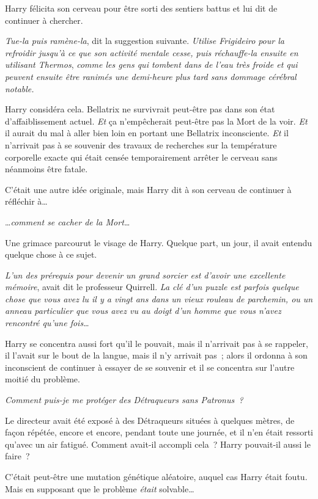 Harry félicita son cerveau pour être sorti des sentiers battus et lui dit de continuer à chercher.

\emph{Tue-la puis ramène-la}, dit la suggestion suivante. \emph{Utilise Frigideiro} \emph{pour la refroidir jusqu'à ce que son activité mentale cesse, puis réchauffe-la ensuite en utilisant Thermos}, \emph{comme les gens qui tombent dans de l'eau très froide et qui peuvent ensuite être ranimés une demi-heure plus tard sans dommage cérébral notable.}

Harry considéra cela. Bellatrix ne survivrait peut-être pas dans son état d'affaiblissement actuel. \emph{Et} ça n'empêcherait peut-être pas la Mort de la voir. \emph{Et} il aurait du mal à aller bien loin en portant une Bellatrix inconsciente. \emph{Et} il n'arrivait pas à se souvenir des travaux de recherches sur la température corporelle exacte qui était censée temporairement arrêter le cerveau sans néanmoins être fatale.

C'était une autre idée originale, mais Harry dit à son cerveau de continuer à réfléchir à…

…\emph{comment se cacher de la Mort…}

Une grimace parcourut le visage de Harry. Quelque part, un jour, il avait entendu quelque chose à ce sujet.

\emph{L'un des prérequis pour devenir un grand sorcier est d'avoir une excellente mémoire}, avait dit le professeur Quirrell. \emph{La clé d'un puzzle est parfois quelque chose que vous avez lu il y a vingt ans dans un vieux rouleau de parchemin, ou un anneau particulier que vous avez vu au doigt d'un homme que vous n'avez rencontré qu'une fois…}

Harry se concentra aussi fort qu'il le pouvait, mais il n'arrivait pas à se rappeler, il l'avait sur le bout de la langue, mais il n'y arrivait pas~; alors il ordonna à son inconscient de continuer à essayer de se souvenir et il se concentra sur l'autre moitié du problème.

\emph{Comment puis-je me protéger des Détraqueurs sans Patronus~?}

Le directeur avait été exposé à des Détraqueurs situées à quelques mètres, de façon répétée, encore et encore, pendant toute une journée, et il n'en était ressorti qu'avec un air fatigué. Comment avait-il accompli cela~? Harry pouvait-il aussi le faire~?

C'était peut-être une mutation génétique aléatoire, auquel cas Harry était foutu. Mais en supposant que le problème \emph{était} solvable…

